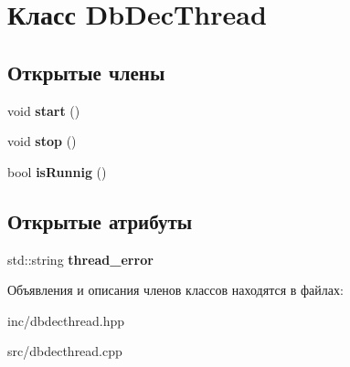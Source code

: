 \hypertarget{classDbDecThread}{}\section{Класс Db\+Dec\+Thread}
\label{classDbDecThread}
\subsection*{Открытые члены}
\begin{DoxyCompactItemize}
\item 
\mbox{\label{classDbDecThread_afb99521e923d3921a5958c57fc4ba19a}} 
void {\bfseries start} ()
\item 
\mbox{\label{classDbDecThread_a1e5791315c04702d78a23d24ce6179c8}} 
void {\bfseries stop} ()
\item 
\mbox{\label{classDbDecThread_a1b2932b54a584f8d82cb1486422a9bee}} 
bool {\bfseries is\+Runnig} ()
\end{DoxyCompactItemize}
\subsection*{Открытые атрибуты}
\begin{DoxyCompactItemize}
\item 
\mbox{\label{classDbDecThread_af7548fecc972da746f069c7045d2d7f3}} 
std\+::string {\bfseries thread\+\_\+error}
\end{DoxyCompactItemize}


Объявления и описания членов классов находятся в файлах\+:\begin{DoxyCompactItemize}
\item 
inc/dbdecthread.\+hpp\item 
src/dbdecthread.\+cpp\end{DoxyCompactItemize}
